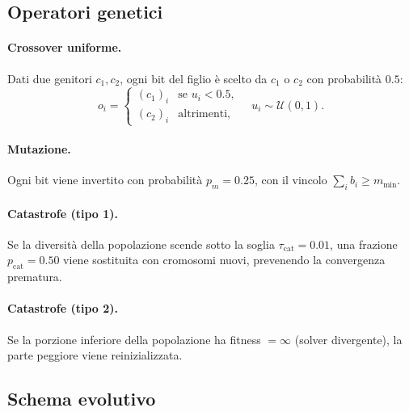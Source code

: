 \subsection{Operatori genetici}

\paragraph{Crossover uniforme.}
Dati due genitori \(c_1,c_2\), ogni bit del figlio è scelto da
\(c_1\) o \(c_2\) con probabilità \(0.5\):
\[
  o_i =
  \begin{cases}
    (c_1)_i & \text{se } u_i < 0.5, \\
    (c_2)_i & \text{altrimenti,}
  \end{cases}
  \quad u_i\sim\mathcal{U}(0,1).
\]

\paragraph{Mutazione.}
Ogni bit viene invertito con probabilità \(p_m=0.25\), con il vincolo
\(\sum_i b_i\geq m_{\min}\).

\paragraph{Catastrofe (tipo 1).}
Se la diversità della popolazione scende sotto la soglia
\(\tau_\text{cat}=0.01\), una frazione \(p_\text{cat}=0.50\) viene
sostituita con cromosomi nuovi, prevenendo la convergenza prematura.

\paragraph{Catastrofe (tipo 2).}
Se la porzione inferiore della popolazione ha fitness \(=\infty\)
(solver divergente), la parte peggiore viene reinizializzata.

\subsection{Schema evolutivo}

